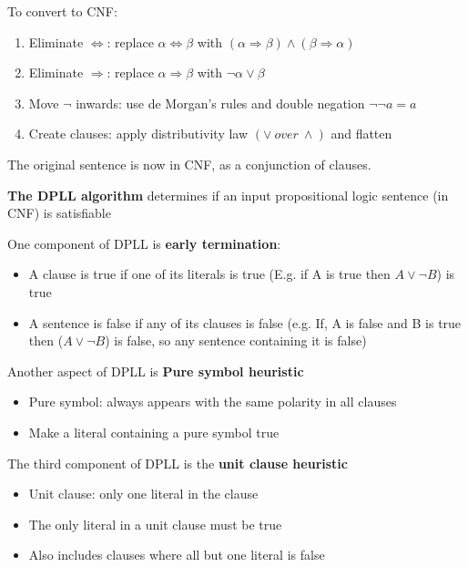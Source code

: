 \documentclass{article}
\begin{document}
To convert to CNF:
\begin{enumerate}
    \item Eliminate $\Leftrightarrow$: replace $\alpha \Leftrightarrow \beta$ with $(\alpha \Rightarrow \beta)\wedge(\beta \Rightarrow \alpha)$
    \item Eliminate $\Rightarrow$: replace $\alpha \Rightarrow \beta$ with $\neg \alpha \vee \beta$
    \item Move $\neg$ inwards: use de Morgan's rules and double negation $\neg \neg a = a$
    \item Create clauses: apply distributivity law $(\vee \: over \: \wedge)$ and flatten
\end{enumerate}

The original sentence is now in CNF, as a conjunction of clauses. 

\textbf{The DPLL algorithm} determines if an input propositional logic sentence (in CNF) is satisfiable

One component of DPLL is \textbf{early termination}:
\begin{itemize}
    \item A clause is true if one of its literals is true (E.g. if A is true then $A \vee \neg B$) is true
    \item A sentence is false if any of its clauses is false (e.g. If, A is false and B is true then ($A \vee \neg B$) is false, so any sentence containing it is false)
\end{itemize}

Another aspect of DPLL is \textbf{Pure symbol heuristic}
\begin{itemize}
    \item Pure symbol: always appears with the same polarity in all clauses
    \item Make a literal containing a pure symbol true
\end{itemize}

The third component of DPLL is the \textbf{unit clause heuristic}
\begin{itemize}
    \item Unit clause: only one literal in the clause
    \item The only literal in a unit clause must be true
    \item Also includes clauses where all but one literal is false
\end{itemize}
\end{document}
